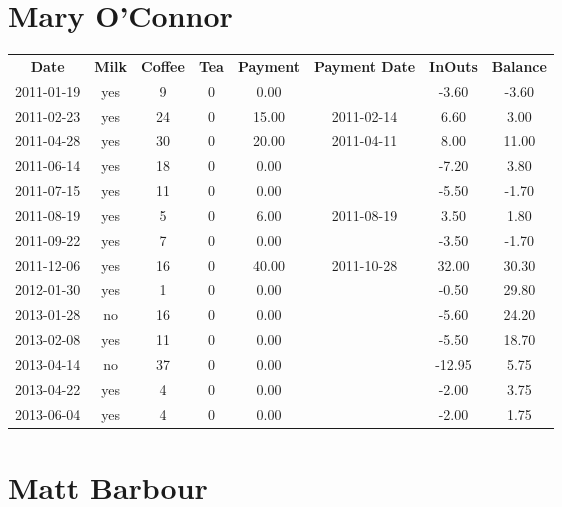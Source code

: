 \section{Mary O'Connor}

\begin{center}
\begin{tabular}{cccccccc}
\textbf{Date} & \textbf{Milk} & \textbf{Coffee} & \textbf{Tea} & \textbf{Payment} & \textbf{Payment Date} & \textbf{InOuts} & \textbf{Balance} \\
2011-01-19 & yes &  9 & 0 &  0.00 &  &  -3.60 & -3.60\\ 
2011-02-23 & yes & 24 & 0 & 15.00 & 2011-02-14 &   6.60 &  3.00\\ 
2011-04-28 & yes & 30 & 0 & 20.00 & 2011-04-11 &   8.00 & 11.00\\ 
2011-06-14 & yes & 18 & 0 &  0.00 &  &  -7.20 &  3.80\\ 
2011-07-15 & yes & 11 & 0 &  0.00 &  &  -5.50 & -1.70\\ 
2011-08-19 & yes &  5 & 0 &  6.00 & 2011-08-19 &   3.50 &  1.80\\ 
2011-09-22 & yes &  7 & 0 &  0.00 &  &  -3.50 & -1.70\\ 
2011-12-06 & yes & 16 & 0 & 40.00 & 2011-10-28 &  32.00 & 30.30\\ 
2012-01-30 & yes &  1 & 0 &  0.00 &  &  -0.50 & 29.80\\ 
2013-01-28 & no & 16 & 0 &  0.00 &  &  -5.60 & 24.20\\ 
2013-02-08 & yes & 11 & 0 &  0.00 &  &  -5.50 & 18.70\\ 
2013-04-14 & no & 37 & 0 &  0.00 &  & -12.95 &  5.75\\ 
2013-04-22 & yes &  4 & 0 &  0.00 &  &  -2.00 &  3.75\\ 
2013-06-04 & yes &  4 & 0 &  0.00 &  &  -2.00 &  1.75
\end{tabular}
\end{center}

\section{Matt Barbour}

